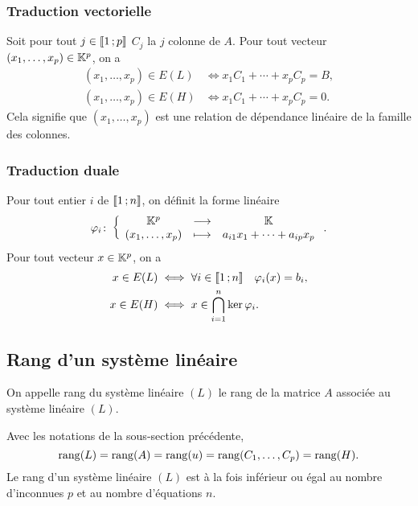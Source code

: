 \subsubsection{Traduction vectorielle}

Soit pour tout \(j \in \mathopen{\llbracket}1\mathclose{}\mathpunct{};p\mathclose{\rrbracket}\) \(C_j\) la \(j\)\ieme{} colonne de \(A\). Pour tout vecteur \((x_1,\ldots,x_p) \in \mathbb{K}^p\), on a
\begin{align}
  (x_1,\ldots,x_p) \in E(L) &\iff x_1C_1+\dotsb+x_pC_p=B, \\
  (x_1,\ldots,x_p) \in E(H) &\iff x_1C_1+\dotsb+x_pC_p=0.
\end{align}
Cela signifie que \((x_1,\ldots,x_p)\) est une relation de dépendance linéaire de la famille des colonnes.

\subsubsection{Traduction duale}

Pour tout entier \(i\) de \(\mathopen{\llbracket}1\mathclose{}\mathpunct{};n\mathclose{\rrbracket}\), on définit la forme linéaire 
\begin{equation}
\varphi_i\colon \left\{\begin{array}{ccc} \mathbb{K}^p & \longrightarrow &\mathbb{K}\\ (x_1,\ldots,x_p) & \longmapsto & a_{i1}x_1+ \dotsb +a_{ip}x_p \end{array} \right..
\end{equation} 
 Pour tout vecteur \(x \in \mathbb{K}^p\), on a
\begin{align}
  x \in E(L) &\iff \forall i \in \mathopen{\llbracket}1\mathclose{}\mathpunct{};n\mathclose{\rrbracket} \quad \varphi_i(x)=b_i, \\
  x \in E(H) &\iff x\in\bigcap_{i=1}^n\ker \varphi_i.
\end{align}

\subsection{Rang d'un système linéaire}

\begin{defdef}
  On appelle rang du système linéaire \((L)\) le rang de la matrice \(A\) associée au système linéaire \((L)\).
\end{defdef}
%
\begin{prop}
  Avec les notations de la sous-section précédente,
  \begin{equation}
    \operatorname{rang}(L)=\operatorname{rang}(A)=\operatorname{rang}(u)=\operatorname{rang}(C_1,\ldots,C_p)=\operatorname{rang}(H).
  \end{equation}
  Le rang d'un système linéaire \((L)\) est à la fois inférieur ou égal au nombre d'inconnues \(p\) et au nombre d'équations \(n\).
\end{prop}

